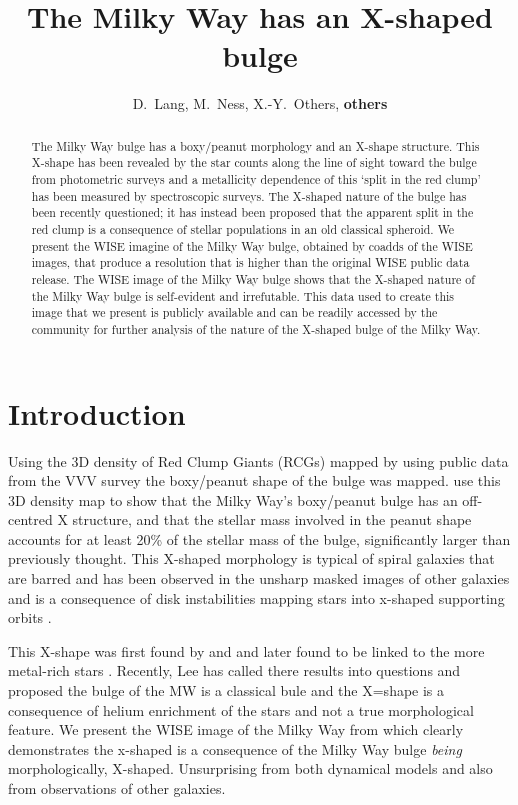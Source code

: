 \documentclass[12pt, preprint]{aastex}
\begin{document}
\title{The Milky Way has an X-shaped bulge} 
\author{D.~Lang,
M.~Ness,
X.-Y.~Others,
\textbf{others}}

\begin{abstract}%
The Milky Way bulge has a boxy/peanut morphology and an X-shape structure. This X-shape has been revealed by the 
star counts along the line of sight toward the bulge from photometric surveys and a metallicity dependence of this 
`split in the red clump' has been measured by spectroscopic surveys. The X-shaped nature of the bulge has been recently questioned; it has instead been proposed that the apparent split in the red clump is a consequence of stellar populations in an old classical spheroid. We present the WISE imagine of the Milky Way bulge, obtained by coadds of the WISE images, that produce a resolution that is higher than the original WISE public data release. The WISE image of the Milky Way bulge shows that the X-shaped nature of the Milky Way bulge is self-evident and irrefutable. This data used to create this image that we present is publicly available and can be readily accessed by the community for further analysis of the nature of the X-shaped bulge of the Milky Way. 
\end{abstract}


\keywords{%
}

\section{Introduction}\label{sec:Intro}

Using the 3D density of Red Clump Giants (RCGs) mapped by \citet{Wegg2013}  using public
data from the VVV survey the boxy/peanut shape of the bulge was mapped. \citet{Portail2015} use this 3D density map to show that the Milky Way's boxy/peanut bulge has an off-centred X structure, and that the stellar mass involved in the peanut shape accounts for at least 20\% of the stellar mass of the bulge, significantly larger than previously thought. This X-shaped morphology is typical of spiral galaxies that are barred and has been observed in the unsharp masked images of other galaxies  and is a consequence of disk instabilities mapping stars into x-shaped supporting orbits \citep[e.g.][]{Debattista, Inma, Lia}. 

This X-shape was first found by \citet{McWillian} and \citet{Nataf} and later found to be linked to the more metal-rich stars \citep{Nes2012, Uttenthaler2012, RJ2014}. Recently, Lee has called there results into questions and proposed the bulge of the MW is a classical bule and the X=shape is a consequence of helium enrichment of the stars and not a true morphological feature. We present the WISE image of the Milky Way from \citet{Lang2014a} which clearly demonstrates the x-shaped is a consequence of the Milky Way bulge \textit{being} morphologically, X-shaped. Unsurprising from both dynamical models and also from observations of other galaxies. 
\end{document}
